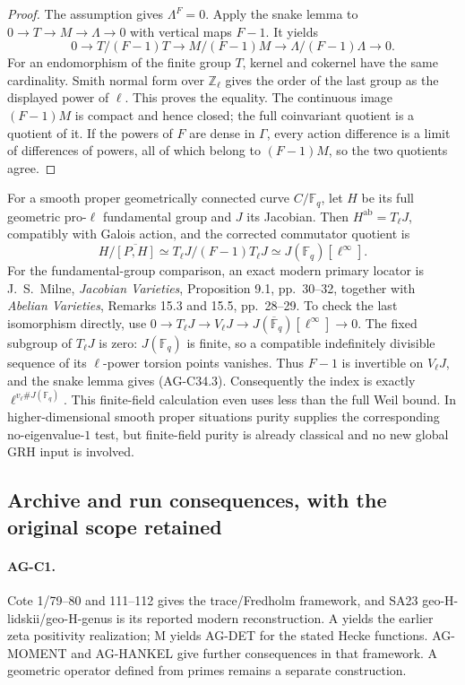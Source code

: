 \documentclass[11pt,a4paper]{article}
\begin{document}
\begin{proof}
The assumption gives $\Lambda^F=0$. Apply the snake lemma to
$0\to T\to M\to\Lambda\to0$ with vertical maps $F-1$.
It yields
\[
 0\longrightarrow T/(F-1)T\longrightarrow M/(F-1)M
 \longrightarrow\Lambda/(F-1)\Lambda\longrightarrow0.
\]
For an endomorphism of the finite group $T$, kernel and cokernel have
the same cardinality. Smith normal form over $\mathbb Z_\ell$ gives
the order of the last group as the displayed power of $\ell$.
This proves the equality. The continuous image $(F-1)M$ is compact
and hence closed; the full coinvariant quotient is a quotient of it.
If the powers of $F$ are dense in $\Gamma$, every action difference
is a limit of differences of powers, all of which belong to
$(F-1)M$, so the two quotients agree.
\end{proof}

For a smooth proper geometrically connected curve $C/\mathbb F_q$,
let $H$ be its full geometric pro-$\ell$ fundamental group and $J$ its
Jacobian. Then $H^{\mathrm{ab}}=T_\ell J$, compatibly with Galois
action, and the corrected commutator quotient is
\[
 H/\overline{[P,H]}
       \simeq T_\ell J/(F-1)T_\ell J
       \simeq J(\mathbb F_q)[\ell^\infty].             \tag{AG-C34.3}
\]
For the fundamental-group comparison, an exact modern primary locator
is J.~S.~Milne, \emph{Jacobian Varieties}, Proposition 9.1,
pp.~30--32, together with \emph{Abelian Varieties}, Remarks 15.3
and 15.5, pp.~28--29. To check the last isomorphism directly, use
$0\to T_\ell J\to V_\ell J\to J(\overline{\mathbb F}_q)
[\ell^\infty]\to0$. The fixed subgroup of $T_\ell J$ is zero:
$J(\mathbb F_q)$ is finite, so a compatible indefinitely divisible
sequence of its $\ell$-power torsion points vanishes. Thus $F-1$ is
invertible on $V_\ell J$, and the snake lemma gives (AG-C34.3).
Consequently the index is exactly $\ell^{v_\ell\#J(\mathbb F_q)}$.
This finite-field calculation even uses less than the full Weil bound.
In higher-dimensional smooth proper situations purity supplies the
corresponding no-eigenvalue-$1$ test, but finite-field purity is already
classical and no new global GRH input is involved.

\subsection{Archive and run consequences, with the original scope retained}
\label{ag:archive}

\paragraph{AG-C1.} Cote 1/79--80 and 111--112 gives the trace/Fredholm
framework, and SA23 geo-H-lidskii/geo-H-genus is its reported modern
reconstruction. A yields the earlier zeta positivity realization;
M yields AG-DET for the stated Hecke functions. AG-MOMENT and AG-HANKEL
give further consequences in that framework. A geometric operator defined
from primes remains a separate construction.
\end{document}
